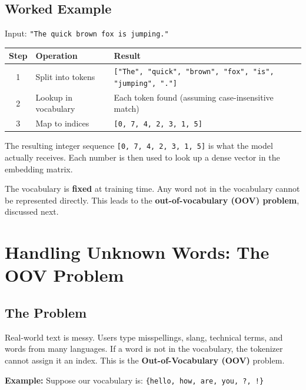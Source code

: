 \documentclass[11pt,a4paper]{article}
\begin{document}
\subsection{Worked Example}

Input: \texttt{"The quick brown fox is jumping."}

\begin{center}
\renewcommand{\arraystretch}{1.3}
\begin{tabular}{@{}clp{8cm}@{}}
\toprule
\textbf{Step} & \textbf{Operation} & \textbf{Result} \\
\midrule
1 & Split into tokens & \texttt{["The", "quick", "brown", "fox", "is", "jumping", "."]} \\
2 & Lookup in vocabulary & Each token found (assuming case-insensitive match) \\
3 & Map to indices & \texttt{[0, 7, 4, 2, 3, 1, 5]} \\
\bottomrule
\end{tabular}
\end{center}

The resulting integer sequence \texttt{[0, 7, 4, 2, 3, 1, 5]} is what the model actually receives. Each number is then used to look up a dense vector in the embedding matrix.

\begin{tcolorbox}[warnbox={Important}]
The vocabulary is \textbf{fixed} at training time. Any word not in the vocabulary cannot be represented directly. This leads to the \textbf{out-of-vocabulary (OOV) problem}, discussed next.
\end{tcolorbox}

\section{Handling Unknown Words: The OOV Problem}

\subsection{The Problem}

Real-world text is messy. Users type misspellings, slang, technical terms, and words from many languages. If a word is not in the vocabulary, the tokenizer cannot assign it an index. This is the \textbf{Out-of-Vocabulary (OOV)} problem.

\textbf{Example:} Suppose our vocabulary is: \texttt{\{hello, how, are, you, ?, !\}}
\end{document}
